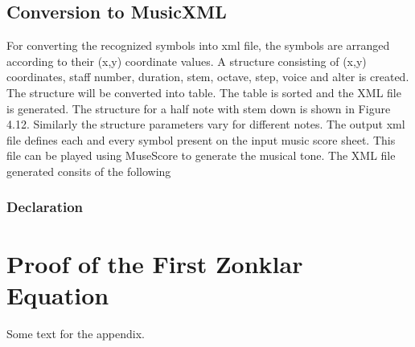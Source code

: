 \documentclass[journal]{IEEEtran}
\begin{document}
\subsection{Conversion to MusicXML}
For converting the recognized symbols into xml file, the symbols are arranged according to their (x,y) coordinate values. A structure consisting of (x,y) coordinates, staff number, duration, stem, octave, step, voice and alter is created. The structure will be converted into table. The table is sorted and the XML file is generated. The structure for a half note with stem down is shown in Figure 4.12. Similarly the structure parameters vary for different notes. The output xml file defines each and every symbol present on the input music score sheet. This file can be played using MuseScore to generate the musical tone. 
The XML file generated consits of the following
\subsubsection{Declaration}

%


\appendices
\section{Proof of the First Zonklar Equation}
Some text for the appendix.
\end{document}
